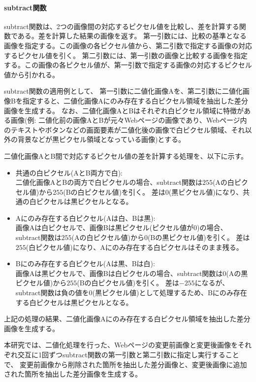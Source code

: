 \paragraph{subtract関数}
subtract関数は、2つの画像間の対応するピクセル値を比較し、差を計算する関数である。差を計算した結果の画像を返す。
第一引数には、比較の基準となる画像を指定する。この画像の各ピクセル値から、第二引数で指定する画像の対応するピクセル値を引く。
第二引数には、第一引数の画像と比較する画像を指定する。この画像の各ピクセル値が、第一引数で指定する画像の対応するピクセル値から引かれる。
\par
subtract関数の適用例として、
第一引数に二値化画像Aを、第二引数に二値化画像Bを指定すると、二値化画像Aにのみ存在する白ピクセル領域を抽出した差分画像を生成する。
なお、二値化画像AとBはそれぞれ白ピクセル領域に特徴がある画像(例: 二値化前の画像AとBが元々Webページの画像であり、Webページ内のテキストやボタンなどの画面要素が二値化後の画像で白ピクセル領域、それ以外の背景などが黒ピクセル領域となっている画像)とする。
\par
二値化画像AとB間で対応するピクセル値の差を計算する処理を、以下に示す。
\begin{itemize}
    \setlength{\itemsep}{0pt}
          \setlength{\parsep}{0pt}
    \item 共通の白ピクセル(AとB両方で白):\\
          二値化画像AとBの両方で白ピクセルの場合、subtract関数は$255$(Aの白ピクセル値)から$255$(Bの白ピクセル値)を引く。
          差は$0$(黒ピクセル値)になり、共通の白ピクセルは黒ピクセルとなる。
    \item Aにのみ存在する白ピクセル(Aは白、Bは黒):\\
          画像Aは白ピクセルで、画像Bは黒ピクセル(ピクセル値が$0$)の場合、subtract関数は$255$(Aの白ピクセル値)から$0$(Bの黒ピクセル値)を引く。
          差は$255$(白ピクセル値)になり、Aにのみ存在する白ピクセルはそのまま残る。
    \item Bにのみ存在する白ピクセル(Aは黒、Bは白):\\
          画像Aは黒ピクセルで、画像Bは白ピクセルの場合、subtract関数は$0$(Aの黒ピクセル値)から$255$(Bの白ピクセル値)を引く。
          差は$-255$になるが、subtract関数は負の値を$0$(黒ピクセル値)として処理するため、Bにのみ存在する白ピクセルは黒ピクセルとなる。
\end{itemize}
上記の処理の結果、二値化画像Aにのみ存在する白ピクセル領域を抽出した差分画像を生成する。
\par
本研究では、二値化処理を行った、Webページの変更前画像と変更後画像をそれぞれ交互に1回ずつsubtract関数の第一引数と第二引数に指定し実行することで、
変更前画像から削除された箇所を抽出した差分画像と、変更後画像に追加された箇所を抽出した差分画像を生成する。

